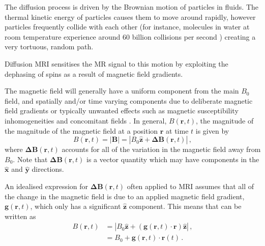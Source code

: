 

The diffusion process is driven by the Brownian motion of particles in fluids.
The thermal kinetic energy of particles causes them to move around rapidly, however particles frequently collide with each other (for instance, molecules in water at room temperature experience around 60 billion collisions per second \cite{Denny1993}) creating a very tortuous, random path.

Diffusion \ac{MRI} sensitises the MR signal to this motion by exploiting the dephasing of spins as a result of magnetic field gradients.


The magnetic field will generally have a uniform component from the main $B_0$ field, and spatially and/or time varying components due to deliberate magnetic field gradients or typically unwanted effects such as magnetic susceptibility inhomogeneities and concomitant fields \cite{Haacke1999}. In general, $B(\mathbf{r}, t)$, the magnitude of the magnitude of the magnetic field at a position $\mathbf{r}$ at time $t$ is given by
\begin{equation}
  B(\mathbf{r}, t) = |\mathbf{B}| = |B_0\mathbf{\hat{z}} + \mathbf{\Delta B}(\mathbf{r}, t)|\,,
  \label{eq:mod_B}
\end{equation}
where $\mathbf{\Delta B}(\mathbf{r}, t)$ accounts for all of the variation in the magnetic field away from $B_0$. Note that $\mathbf{\Delta B}(\mathbf{r}, t)$ is a vector quantity which may have components in the $\mathbf{\hat{x}}$ and $\mathbf{\hat{y}}$ directions. 

An idealised expression for $\mathbf{\Delta B}(\mathbf{r}, t)$ often applied to \ac{MRI} assumes that all of the change in the magnetic field is due to an applied magnetic field gradient, $\mathbf{g}(\mathbf{r}, t)$, which only has a significant $\mathbf{\hat{z}}$ component. This means that  can be written as
\begin{align}
  B(\mathbf{r}, t) &= \left|B_0\mathbf{\hat{z}} + \left(\mathbf{g}(\mathbf{r}, t)\cdot\mathbf{r}\right) \mathbf{\hat{z}}\right|\,,\nonumber \\
                      &= B_0 + \mathbf{g}(\mathbf{r}, t)\cdot\mathbf{r}(t)\,.
                        \label{eq:mod_B_ideal}
\end{align}

